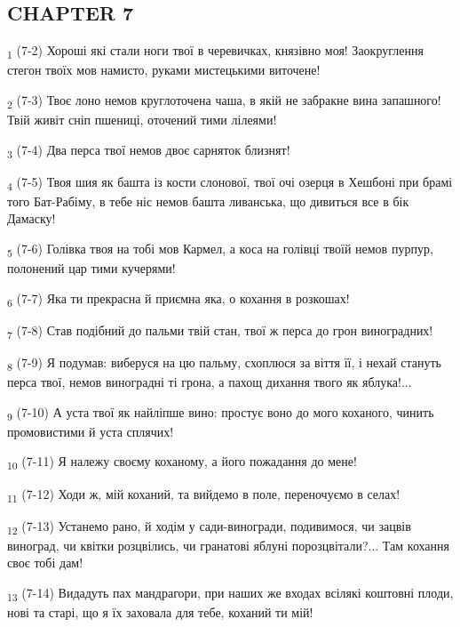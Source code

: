\subsection{CHAPTER 7}
\begin{tcolorbox}
\textsubscript{1} (7-2) Хороші які стали ноги твої в черевичках, князівно моя! Заокруглення стегон твоїх мов намисто, руками мистецькими виточене!
\end{tcolorbox}
\begin{tcolorbox}
\textsubscript{2} (7-3) Твоє лоно немов круглоточена чаша, в якій не забракне вина запашного! Твій живіт сніп пшениці, оточений тими лілеями!
\end{tcolorbox}
\begin{tcolorbox}
\textsubscript{3} (7-4) Два перса твої немов двоє сарняток близнят!
\end{tcolorbox}
\begin{tcolorbox}
\textsubscript{4} (7-5) Твоя шия як башта із кости слонової, твої очі озерця в Хешбоні при брамі того Бат-Рабіму, в тебе ніс немов башта ливанська, що дивиться все в бік Дамаску!
\end{tcolorbox}
\begin{tcolorbox}
\textsubscript{5} (7-6) Голівка твоя на тобі мов Кармел, а коса на голівці твоїй немов пурпур, полонений цар тими кучерями!
\end{tcolorbox}
\begin{tcolorbox}
\textsubscript{6} (7-7) Яка ти прекрасна й приємна яка, о кохання в розкошах!
\end{tcolorbox}
\begin{tcolorbox}
\textsubscript{7} (7-8) Став подібний до пальми твій стан, твої ж перса до грон виноградних!
\end{tcolorbox}
\begin{tcolorbox}
\textsubscript{8} (7-9) Я подумав: виберуся на цю пальму, схоплюся за віття її, і нехай стануть перса твої, немов виноградні ті грона, а пахощ дихання твого як яблука!...
\end{tcolorbox}
\begin{tcolorbox}
\textsubscript{9} (7-10) А уста твої як найліпше вино: простує воно до мого коханого, чинить промовистими й уста сплячих!
\end{tcolorbox}
\begin{tcolorbox}
\textsubscript{10} (7-11) Я належу своєму коханому, а його пожадання до мене!
\end{tcolorbox}
\begin{tcolorbox}
\textsubscript{11} (7-12) Ходи ж, мій коханий, та вийдемо в поле, переночуємо в селах!
\end{tcolorbox}
\begin{tcolorbox}
\textsubscript{12} (7-13) Устанемо рано, й ходім у сади-виногради, подивимося, чи зацвів виноград, чи квітки розцвілись, чи гранатові яблуні порозцвітали?... Там кохання своє тобі дам!
\end{tcolorbox}
\begin{tcolorbox}
\textsubscript{13} (7-14) Видадуть пах мандрагори, при наших же входах всілякі коштовні плоди, нові та старі, що я їх заховала для тебе, коханий ти мій!
\end{tcolorbox}
